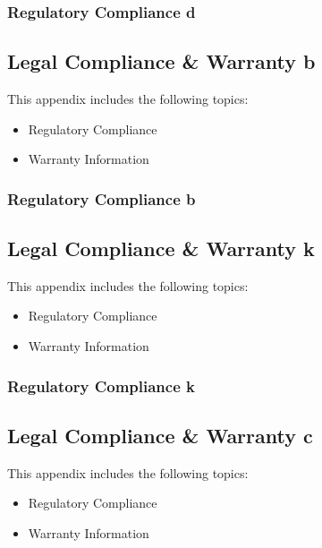 \documentclass[letterpaper,10pt,openany,oneside,english]{sphinxmanual}
\begin{document}
\subsubsection{Regulatory Compliance d}
\label{\detokenize{team:regulatory-compliance-d}}

\subsection{Legal Compliance \& Warranty b}
\label{\detokenize{whatissurf:legal-compliance-warranty-b}}\label{\detokenize{whatissurf::doc}}
This appendix includes the following topics:
\begin{itemize}
\item {} 
Regulatory Compliance

\item {} 
Warranty Information

\end{itemize}


\subsubsection{Regulatory Compliance b}
\label{\detokenize{whatissurf:regulatory-compliance-b}}

\subsection{Legal Compliance \& Warranty k}
\label{\detokenize{builtbysurf:legal-compliance-warranty-k}}\label{\detokenize{builtbysurf::doc}}
This appendix includes the following topics:
\begin{itemize}
\item {} 
Regulatory Compliance

\item {} 
Warranty Information

\end{itemize}


\subsubsection{Regulatory Compliance k}
\label{\detokenize{builtbysurf:regulatory-compliance-k}}

\subsection{Legal Compliance \& Warranty c}
\label{\detokenize{ukcompany:legal-compliance-warranty-c}}\label{\detokenize{ukcompany::doc}}
This appendix includes the following topics:
\begin{itemize}
\item {} 
Regulatory Compliance

\item {} 
Warranty Information

\end{itemize}
\end{document}
